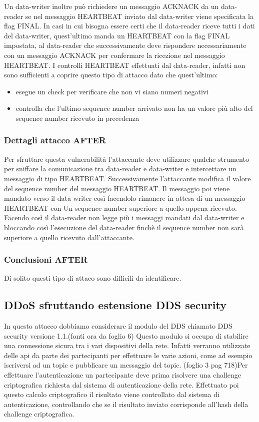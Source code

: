 Un data-writer inoltre può richiedere un messaggio ACKNACK da un data-reader se 
nel messaggio HEARTBEAT inviato dal data-writer viene specificata la flag FINAL.
In casi in cui bisogna essere certi che il data-reader riceve tutti i dati del
data-writer, quest'ultimo manda un HEARTBEAT con la flag FINAL impostata, al
data-reader che successivamente deve rispondere necessariamente con un messaggio
ACKNACK per confermare la ricezione nel messaggio HEARTBEAT.
I controlli HEARTBEAT effettuati dal data-reader,
infatti non sono sufficienti a coprire questo tipo di attacco
dato che quest'ultimo:
\begin{itemize}
    \item esegue un check per verificare che non vi siano numeri negativi
    \item controlla che l'ultimo sequence number arrivato non ha un valore più alto 
    del sequence number ricevuto in precedenza 
\end{itemize}
\subsubsection{Dettagli attacco AFTER}
Per sfruttare questa vulnerabilità l'attaccante deve utilizzare qualche strumento
per sniffare la comunicazione tra data-reader e data-writer e intercettare un
messaggio di tipo HEARTBEAT. Successivamente l'attaccante modifica il valore del
sequence number del messaggio HEARTBEAT. Il messaggio poi viene mandato verso il
data-writer così facendolo rimanere in attesa di un messaggio HEARTBEAT con Un
sequence number superiore a quello appena ricevuto. Facendo così il data-reader
non legge più i messaggi mandati dal data-writer e bloccando così l'esecuzione
del data-reader finchè il sequence number non 
sarà superiore a quello ricevuto dall'attaccante.

\subsubsection{Conclusioni AFTER}
Di solito questi tipo di attaco sono difficili da identificare.

\subsection{DDoS sfruttando estensione DDS security}
In questo attacco dobbiamo considerare il modulo del DDS chiamato DDS security
versione 1.1.(fonti ora da foglio 6) Questo modulo si occupa di stabilire una
connessione sicura tra i vari dispositivi della rete. Infatti verranno utilizzate
delle api da parte dei partecipanti per effettuare le varie azioni, come
ad esempio iscriversi ad un topic e pubblicare un messaggio del topic.
(foglio 3 pag 718)Per effettuare l'autenticazione un partecipante deve prima
risolvere una challenge criptografica richiesta dal sistema di autenticazione
della rete. Effettuato poi questo calcolo criptografico il risultato viene
controllato dal sistema di autenticazione, controllando che se il risultato
inviato corrisponde all'hash della challenge criptografica.

